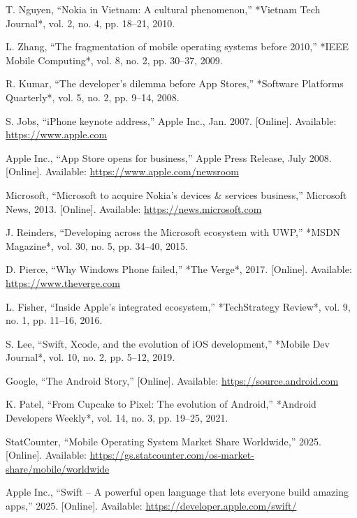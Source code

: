 \documentclass[12pt]{report}
\begin{document}
\begin{thebibliography}{1}
  T. Nguyen, ``Nokia in Vietnam: A cultural phenomenon,'' *Vietnam Tech Journal*, vol. 2, no. 4, pp. 18–21, 2010.

  L. Zhang, ``The fragmentation of mobile operating systems before 2010,'' *IEEE Mobile Computing*, vol. 8, no. 2, pp. 30–37, 2009.

  R. Kumar, ``The developer’s dilemma before App Stores,'' *Software Platforms Quarterly*, vol. 5, no. 2, pp. 9–14, 2008.

  S. Jobs, ``iPhone keynote address,'' Apple Inc., Jan. 2007. [Online]. Available: \url{https://www.apple.com}

  Apple Inc., ``App Store opens for business,'' Apple Press Release, July 2008. [Online]. Available: \url{https://www.apple.com/newsroom}

  Microsoft, ``Microsoft to acquire Nokia’s devices \& services business,'' Microsoft News, 2013. [Online]. Available: \url{https://news.microsoft.com}

  J. Reinders, ``Developing across the Microsoft ecosystem with UWP,'' *MSDN Magazine*, vol. 30, no. 5, pp. 34–40, 2015.

  D. Pierce, ``Why Windows Phone failed,'' *The Verge*, 2017. [Online]. Available: \url{https://www.theverge.com}

  L. Fisher, ``Inside Apple’s integrated ecosystem,'' *TechStrategy Review*, vol. 9, no. 1, pp. 11–16, 2016.

  S. Lee, ``Swift, Xcode, and the evolution of iOS development,'' *Mobile Dev Journal*, vol. 10, no. 2, pp. 5–12, 2019.

  Google, ``The Android Story,'' [Online]. Available: \url{https://source.android.com}

  K. Patel, ``From Cupcake to Pixel: The evolution of Android,'' *Android Developers Weekly*, vol. 14, no. 3, pp. 19–25, 2021.

  StatCounter, ``Mobile Operating System Market Share Worldwide,'' 2025. [Online]. Available: \url{https://gs.statcounter.com/os-market-share/mobile/worldwide}

  Apple Inc., ``Swift – A powerful open language that lets everyone build amazing apps,'' 2025. [Online]. Available: \url{https://developer.apple.com/swift/}


\end{thebibliography}
\end{document}
